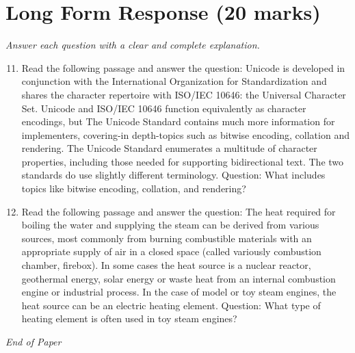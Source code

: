 \documentclass[12pt]{article}
\begin{document}
\section*{Long Form Response (20 marks)}
\textit{Answer each question with a clear and complete explanation.}
\begin{enumerate}[label=\arabic*.]
\setcounter{enumi}{10}
\item Read the following passage and answer the question: Unicode is developed in conjunction with the International Organization for Standardization and shares the character repertoire with ISO/IEC 10646: the Universal Character Set. Unicode and ISO/IEC 10646 function equivalently as character encodings, but The Unicode Standard contains much more information for implementers, covering-in depth-topics such as bitwise encoding, collation and rendering. The Unicode Standard enumerates a multitude of character properties, including those needed for supporting bidirectional text. The two standards do use slightly different terminology. Question: What includes topics like bitwise encoding, collation, and rendering?
\item Read the following passage and answer the question: The heat required for boiling the water and supplying the steam can be derived from various sources, most commonly from burning combustible materials with an appropriate supply of air in a closed space (called variously combustion chamber, firebox). In some cases the heat source is a nuclear reactor, geothermal energy, solar energy or waste heat from an internal combustion engine or industrial process. In the case of model or toy steam engines, the heat source can be an electric heating element. Question: What type of heating element is often used in toy steam engines?
\end{enumerate}

\vfill
\noindent\textit{End of Paper}
\end{document}
